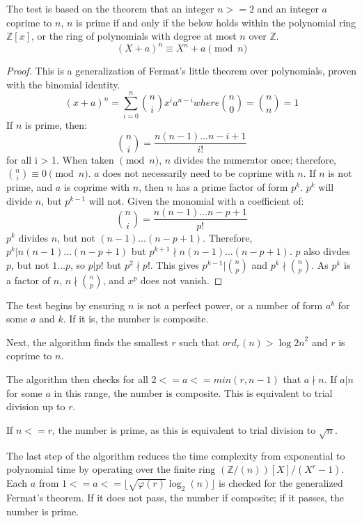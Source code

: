 \documentclass{article}
\begin{document}
The test is based on the theorem that an integer $n >= 2$ and an integer $a$ coprime to $n$, $n$ is prime if and only if the below holds within the polynomial ring $\mathbb{Z}[x]$, or the ring of polynomials with degree at most $n$ over $\mathbb{Z}$.
\[
    (X + a)^n \equiv X^n + a \pmod{n}
\]

\begin{proof} %
    This is a generalization of Fermat's little theorem over polynomials, proven with the binomial identity.
    \[
        (x + a)^n = \sum_{i=0}^{n} \binom{n}{i} x^i a^{n - i} where \binom{n}{0} = \binom{n}{n} = 1
    \]
    If $n$ is prime, then:
    \[
        \binom{n}{i} = \frac{n (n - 1) \ldots{} {n - i + 1}}{i!}
    \]
    for all i > 1. When taken $\pmod{n}$, $n$ divides the numerator once; therefore, $\binom{n}{i} \equiv 0 \pmod{n}$. $a$ does not necessarily need to be coprime with $n$.
    If $n$ is not prime, and $a$ is coprime with $n$, then $n$ has a prime factor of form $p^k$. $p^k$ will divide $n$, but $p^{k - 1}$ will not. Given the monomial with a coefficient of:
    \[
        \binom{n}{i} = \frac{n (n - 1) \ldots{} {n - p + 1}}{p!}
    \]
    $p^k$ divides $n$, but not $(n - 1) \ldots{} (n - p + 1)$. Therefore, $p^k \vert n (n - 1) \ldots{} (n - p + 1)$ but $p^{k + 1} \nmid n (n - 1) \ldots{} (n - p + 1)$. $p$ also divdes $p$, but not $1 \ldots p$, so $p \vert p!$ but $p^2 \nmid p!$. This gives $p^{k - 1} \vert \binom{n}{p}$ and $p^k \nmid \binom{n}{p}$. As $p^k$ is a factor of $n$, $n \nmid \binom{n}{p}$, and $x^p$ does not vanish.
\end{proof}

The test begins by ensuring $n$ is not a perfect power, or a number of form $a^k$ for some $a$ and $k$. If it is, the number is composite.

Next, the algorithm finds the smallest $r$ such that $ord_r(n) > {\log{2}{n}}^2$ and $r$ is coprime to $n$.

The algorithm then checks for all $2 <= a <= min(r, n - 1)$ that $a \nmid n$. If $a \vert n$ for some $a$ in this range, the number is composite. This is equivalent to trial division up to $r$.

If $n <= r$, the number is prime, as this is equivalent to trial division to $\sqrt{n}$.

The last step of the algorithm reduces the time complexity from exponential to polynomial time by operating over the finite ring $(\mathbb{Z}/(n))[X] / (X^r - 1)$. Each $a$ from $1 <= a <= \lfloor \sqrt{\varphi(r)}\log_2(n) \rfloor$ is checked for the generalized Fermat's theorem. If it does not pass, the number if composite; if it passes, the number is prime.
\end{document}
